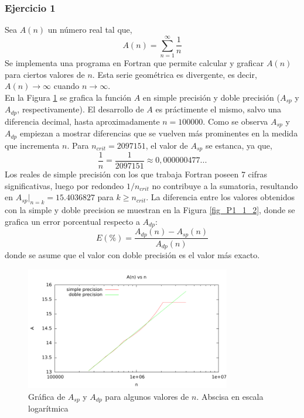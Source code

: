 \subsubsection{Ejercicio 1}

Sea $A(n)$ un número real tal que,
\begin{equation}
A(n) = \sum_{n=1}^\infty \dfrac{1}{n}
\end{equation}
Se implementa una programa en Fortran que permite calcular y graficar $A(n)$ para ciertos valores de $n$. Esta serie geométrica es divergente, es decir, $A(n) \rightarrow \infty$ cuando $n \rightarrow \infty$. \\

En la Figura \ref{fig_P1_1_1} se grafica la función $A$ en simple precisión y doble precisión ($A_{sp}$ y $A_{dp}$, respectivamente). El desarrollo de $A$ es práctimente el mismo, salvo una diferencia decimal, hasta aproximadamente $n = 100 000 $. Como se observa $A_{sp}$ y $A_{dp}$ empiezan a mostrar diferencias que se vuelven más prominentes en la medida que incrementa $n$. Para $n_{crit} = 2 097 151$, el valor de $A_{sp}$ se estanca, ya que,
$$ \dfrac{1}{n} = \dfrac{1}{2 097 151} \approx 0,000000477... $$
Los reales de simple precisión con los que trabaja Fortran poseen 7 cifras significativas, luego por redondeo $1/n_{crit}$ no contribuye a la sumatoria, resultando en $A_{sp} | _{n=k} = 15.4036827$ para $k \geq n_{crit} $. La diferencia entre los valores obtenidos con la simple y doble precision se muestran en la Figura \ref{fig_P1_1_2}, donde se grafica un error porcentual respecto a $A_{dp}$:
\begin{equation}
E(\%) = \dfrac{ A_{dp}(n) - A_{sp}(n) }{ A_{dp}(n) }
\end{equation}
donde se asume que el valor con doble precisión es el valor más exacto.\\

\begin{figure} [H]
\begin{center}
\includegraphics[width=0.8\textwidth]{./parte2/graficos/grafico_p1.pdf}
\caption{Gráfica de $A_{sp}$ y $A_{dp}$ para algunos valores de $n$. Abscisa en escala logarítmica} \label{fig_P1_1_1}
\end{center}
\end{figure}


